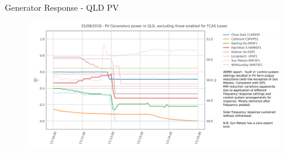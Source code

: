\begin{frame}{Generator Response - QLD PV}

\begin{figure}
    \centering
    \includegraphics[width=\linewidth]{figures/QLD_PV_PU_annotated.png}
    \label{fig:qld_pv}
\end{figure}


\end{frame}
